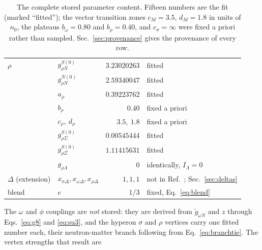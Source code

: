 \documentclass[aps,prc,onecolumn,superscriptaddress,nofootinbib,10pt]{revtex4-2}
\newcommand{\nzero}{n_0}
\begin{document}
\begin{table}[h]
\begin{tabular}{llrl}
\midrule
$\rho$ & $g^{S(0)}_{\rho N}$ & $3.23020263$ & fitted \\
       & $g^{N(0)}_{\rho N}$ & $2.59340047$ & fitted \\
       & $a_\rho$            & $0.39223762$ & fitted \\
       & $b_\rho$            & $0.40$       & fixed a priori \\
       & $c_\rho,\ d_\rho$   & $3.5,\ 1.8$  & fixed a priori \\
       & $g^{S(0)}_{\rho\Sigma}$ & $0.00545444$ & fitted \\
       & $g^{S(0)}_{\rho\Xi}$    & $1.11415631$ & fitted \\
       & $g_{\rho\Lambda}$       & $0$          & identically, $I_\Lambda = 0$ \\
\midrule
$\Delta$ (extension) & $x_{\sigma\Delta},x_{\omega\Delta},x_{\rho\Delta}$
       & $1,1,1$ & not in Ref.~\cite{Frohaug2025}; Sec.~\ref{sec:deltas} \\
\midrule
blend & $e$ & $1/3$ & fixed, Eq.~\eqref{eq:blend} \\
\bottomrule
\end{tabular}
\caption{The complete stored parameter content. Fifteen numbers are the fit
(marked ``fitted''); the vector transition zones $c_M = 3.5$, $d_M = 1.8$ in
units of $\nzero$, the plateaus $b_\omega = 0.80$ and $b_\rho = 0.40$, and
$c_\sigma = \infty$ were fixed a priori rather than sampled.
Sec.~\ref{sec:provenance} gives the provenance of every row.}
\label{tab:params}
\end{table}

The $\omega$ and $\phi$ couplings are \emph{not} stored: they are derived from
$\tilde{g}_{\omega N}$ and $z$ through Eqs.~\eqref{eq:g8} and \eqref{eq:su3},
and the hyperon $\sigma$ and $\rho$ vertices carry one fitted number each, their
neutron-matter branch following from Eq.~\eqref{eq:branchtie}. The vertex
strengths that result are
\end{document}

